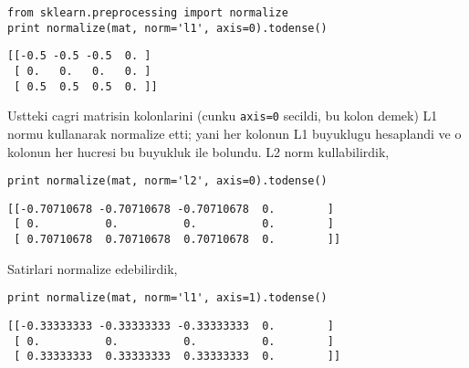 \documentclass[12pt,fleqn]{article}\usepackage{../common}
\begin{document}
\begin{verbatim}
from sklearn.preprocessing import normalize
print normalize(mat, norm='l1', axis=0).todense()
\end{verbatim}

\begin{verbatim}
[[-0.5 -0.5 -0.5  0. ]
 [ 0.   0.   0.   0. ]
 [ 0.5  0.5  0.5  0. ]]
\end{verbatim}

Ustteki cagri matrisin kolonlarini (cunku \verb!axis=0! secildi, bu kolon
demek) L1 normu kullanarak normalize etti; yani her kolonun L1 buyuklugu
hesaplandi ve o kolonun her hucresi bu buyukluk ile bolundu. L2 norm
kullabilirdik, 

\begin{verbatim}
print normalize(mat, norm='l2', axis=0).todense()
\end{verbatim}

\begin{verbatim}
[[-0.70710678 -0.70710678 -0.70710678  0.        ]
 [ 0.          0.          0.          0.        ]
 [ 0.70710678  0.70710678  0.70710678  0.        ]]
\end{verbatim}

Satirlari normalize edebilirdik, 

\begin{verbatim}
print normalize(mat, norm='l1', axis=1).todense()
\end{verbatim}

\begin{verbatim}
[[-0.33333333 -0.33333333 -0.33333333  0.        ]
 [ 0.          0.          0.          0.        ]
 [ 0.33333333  0.33333333  0.33333333  0.        ]]
\end{verbatim}
\end{document}
